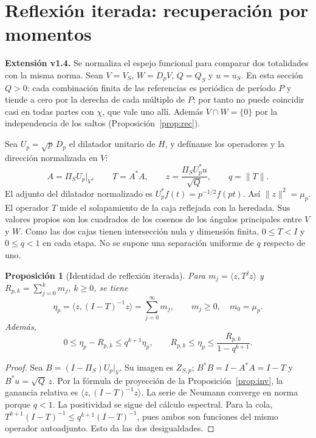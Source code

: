 \documentclass[11pt,a4paper]{article}
\theoremstyle{plain}
\newtheorem{proposicion}{Proposición}
\begin{document}
\section{Reflexión iterada: recuperación por momentos}
\label{sec:iterada}

\textbf{Extensión v1.4.} Se normaliza el espejo funcional para comparar dos totalidades con la misma norma. Sean $V=V_S$, $W=D_pV$, $Q=Q_S$ y $u=u_S$. En esta sección $Q>0$: cada combinación finita de las referencias es periódica de período $P$ y tiende a cero por la derecha de cada múltiplo de $P$; por tanto no puede coincidir casi en todas partes con $\chi$, que vale uno allí. Además $V\cap W=\{0\}$ por la independencia de los saltos (Proposición~\ref{prop:rec}).

Sea $U_p=\sqrt p\,D_p$ el dilatador unitario de $H$, y defínanse los operadores y la dirección normalizada en $V$:
\[
 A=\Pi_S U_p|_V,\qquad T=A^*A,\qquad
 z=\frac{\Pi_S U_p^*u}{\sqrt Q},\qquad q=\|T\|.
\]
El adjunto del dilatador normalizado es $U_p^*f(t)=p^{-1/2}f(pt)$. Así $\|z\|^2=\mu_p$. El operador $T$ mide el solapamiento de la caja reflejada con la heredada. Sus valores propios son los cuadrados de los cosenos de los ángulos principales entre $V$ y $W$. Como las dos cajas tienen intersección nula y dimensión finita, $0\le T<I$ y $0\le q<1$ en cada etapa. No se supone una separación uniforme de $q$ respecto de uno.

\begin{proposicion}[Identidad de reflexión iterada]\label{prop:iterada}
Para $m_j=\langle z,T^jz\rangle$ y $R_{p,k}=\sum_{j=0}^k m_j$, $k\ge0$, se tiene
\begin{equation}\label{eq:momentos}
 \eta_p=\langle z,(I-T)^{-1}z\rangle
       =\sum_{j=0}^{\infty}m_j,\qquad m_j\ge0,\quad m_0=\mu_p.
\end{equation}
Además,
\begin{equation}\label{eq:cola}
 0\le\eta_p-R_{p,k}\le q^{k+1}\eta_p,
 \qquad R_{p,k}\le\eta_p\le\frac{R_{p,k}}{1-q^{k+1}}.
\end{equation}
\end{proposicion}
\begin{proof}
Sea $B=(I-\Pi_S)U_p|_V$. Su imagen es $Z_{S,p}$; $B^*B=I-A^*A=I-T$ y $B^*u=\sqrt Q\,z$. Por la fórmula de proyección de la Proposición~\ref{prop:inv}, la ganancia relativa es $\langle z,(I-T)^{-1}z\rangle$. La serie de Neumann converge en norma porque $q<1$. La positividad se sigue del cálculo espectral. Para la cola, $T^{k+1}(I-T)^{-1}\le q^{k+1}(I-T)^{-1}$, pues ambos son funciones del mismo operador autoadjunto. Esto da las dos desigualdades.
\end{proof}
\end{document}
